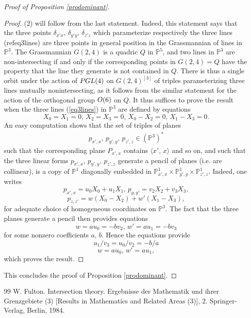 \documentclass[10pt,a4paper]{amsart}
\begin{document}
\begin{proof}[Proof of Proposition \ref{prodominant}]
\begin{proof}
 (2) will  follow from the last statement. Indeed, this statement says that the  three points $\delta_{x'x},\,\delta_{y'y},\,\delta_{z'z}$ which parameterize respectively the three  lines
(ref{eq3lines})
are three points in general position in the Grassmannian of lines in $\mathbb{P}^3$. The Grassmannian $G(2,4)$ is a quadric $Q$ in $\mathbb{P}^5$, and two lines in $\mathbb{P}^3$ are non-intersecting if and only if the corresponding points in $G(2,4)=Q$ have the property that the line they generate is not contained in $Q$.   There is  thus a single orbit  under the action of ${\rm PGL}(4)$  on $G(2,4)^{[3]}$  of triples parameterizing three lines  mutually nonintersecting, as it follows from the similar statement for the action of the orthogonal group ${\rm O}(6)$ on $Q$. It thus suffices to prove the result when the three lines (\ref{eq3lines}) in $\mathbb{P}^3$  are defined  by equations
$$X_0=X_1=0,\,X_2=X_3=0,\,X_0-X_2=0,\,X_1-X_3=0.$$
An easy computation shows that the set of triples of planes
\begin{eqnarray}\label{eq3planes} p_{x',x}, \,p_{y',y}, \,p_{ z',z}\in (\mathbb{P}^3)^*
\end{eqnarray}
such that the corresponding plane $P_{x',x}$ contains $\langle x',\,x\rangle$ and so on, and such that the three linear forms $p_{x',x}, \,p_{y',y}, \,p_{ z',z}$ generate a pencil of planes (i.e. are collinear),  is a copy of $\mathbb{P}^1$ diagonally embedded in $\mathbb{P}^1_{x',x}\times \mathbb{P}^1_{y',y}\times \mathbb{P}^1_{z',z}$. Indeed,
one writes   $$p_{x',x}=u_0X_0+u_1 X_1,\,p_{y,y'}=v_2X_2+v_3X_3,$$
 $$p_{z,z'}=w(X_0-X_2)+w'(X_1-X_3),$$ for adequate choice of homogeneous coordinates on $\mathbb{P}^3$. The fact that the three planes generate a pencil then provides  equations
$$ w=au_0=-bv_2,\,w'=au_1=-bv_3
$$
for some nonzero coefficients $a,\,b$. Hence the equations provide
$$u_1/v_3=u_0/v_2=-b/a$$
$$w=au_0,\,w'=au_1,$$
which proves the result.
\end{proof}
This concludes the proof of Proposition \ref{prodominant}.
\end{proof}

\begin{thebibliography}{99}
 W. Fulton. Intersection theory. Ergebnisse der Mathematik und ihrer Grenzgebiete (3) [Results in Mathematics and Related Areas (3)], 2. Springer-Verlag, Berlin, 1984.
\end{thebibliography}
\end{document}
